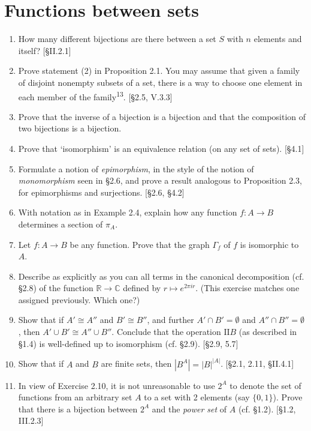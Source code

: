 \section{Functions between sets}
\begin{enumerate}
    \item How many different bijections are there between a set $S$ with $n$ elements and itself? [\S II.2.1]
\item Prove statement (2) in Proposition 2.1. You may assume that given a family of disjoint nonempty subsets of a set, there is a way to choose one element in each member of the family\textsuperscript{13}. [\S2.5, V.3.3]
\item Prove that the inverse of a bijection is a bijection and that the composition of two bijections is a bijection.
\item Prove that `isomorphism' is an equivalence relation (on any set of sets). [\S4.1]
\item Formulate a notion of \textit{epimorphism}, in the style of the notion of \textit{monomorphism} seen in \S2.6, and prove a result analogous to Proposition 2.3, for epimorphisms and surjections. [\S2.6, \S4.2]
\item With notation as in Example 2.4, explain how any function $f: A \to B$ determines a section of $\pi_A$.
\item Let $f: A \to B$ be any function. Prove that the graph $\Gamma_f$ of $f$ is isomorphic to $A$.
\item Describe as explicitly as you can all terms in the canonical decomposition (cf. \S2.8) of the function $\mathbb{R} \to \mathbb{C}$ defined by $r \mapsto e^{2\pi i r}$. (This exercise matches one assigned previously. Which one?)
\item Show that if $A' \cong A''$ and $B' \cong B''$, and further $A' \cap B' = \emptyset$ and $A'' \cap B'' = \emptyset$, then $A' \cup B' \cong A'' \cup B''$. Conclude that the operation $\text{II}B$ (as described in \S1.4) is well-defined up to isomorphism (cf. \S2.9). [\S2.9, 5.7]
\item Show that if $A$ and $B$ are finite sets, then $|B^A| = |B|^{|A|}$. [\S2.1, 2.11, \S II.4.1]
\item In view of Exercise 2.10, it is not unreasonable to use $2^A$ to denote the set of functions from an arbitrary set $A$ to a set with 2 elements (say $\{0,1\}$). Prove that there is a bijection between $2^A$ and the \textit{power set} of $A$ (cf. \S1.2). [\S1.2, III.2.3]
\end{enumerate}